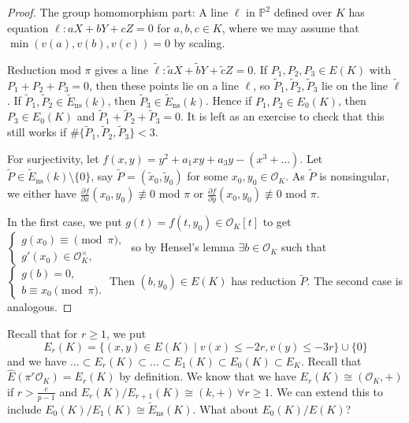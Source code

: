 \documentclass{article}
\theoremstyle{definition}
\begin{document}
\begin{proof}
    The group homomorphism part: A line $\ell$ in $\mathbb{P}^2$ defined over $K$ has equation $\ell : aX+bY+cZ=0$ for $a,b,c \in K$, where we may assume that $\min(v(a),v(b),v(c))=0$ by scaling.
    \vspace{1mm}
     
    Reduction mod $\pi$ gives a line $\widetilde{\ell}: \widetilde{a}X+\widetilde{b}Y+\widetilde{c}Z=0$. If $P_1,P_2,P_3 \in E(K)$ with $P_1+P_2+P_3=0$, then these points lie on a line $\ell$, so $\widetilde{P}_1, \widetilde{P}_2, \widetilde{P}_3$ lie on the line $\widetilde{\ell}$. If $\widetilde{P}_1,\widetilde{P}_2 \in \widetilde{E}_{\text{ns}}(k)$, then $\widetilde{P}_3 \in \widetilde{E}_{\text{ns}}(k)$. Hence if $P_1,P_2 \in E_0(K)$, then $P_3 \in E_0(K)$ and $\widetilde{P}_1 + \widetilde{P}_2 + \widetilde{P}_3=0$. It is left as an exercise to check that this still works if $\#\{\widetilde{P}_1,\widetilde{P}_2,\widetilde{P}_3\}<3$.
    \vspace{1mm}
     
    For surjectivity, let $f(x,y) = y^2+a_1xy+a_3y-(x^3+\ldots)$. Let $\widetilde{P} \in \widetilde{E}_{\text{ns}}(k) \setminus \{0\}$, say $\widetilde{P}=(\widetilde{x}_0,\widetilde{y}_0)$ for some $x_0,y_0 \in \mathcal{O}_K$. As $\widetilde{P}$ is nonsingular, we either have $\frac{\partial f}{\partial x}(x_0,y_0) \not\equiv 0$ mod $\pi$ or $\frac{\partial f}{\partial y}(x_0,y_0) \not\equiv 0$ mod $\pi$.
    \vspace{1mm}
     
    In the first case, we put $g(t)=f(t,y_0) \in \mathcal{O}_K[t]$ to get $\begin{cases}
        g(x_0)\equiv \pmod{\pi},\\
        g'(x_0) \in \mathcal{O}_K^\times,
    \end{cases}$ so by Hensel's lemma $\exists b \in \mathcal{O}_K$ such that $\begin{cases}
        g(b)=0,\\
        b \equiv x_0 \pmod{\pi}. 
    \end{cases}$ Then $(b,y_0) \in E(K)$ has reduction $\widetilde{P}$. The second case is analogous.
\end{proof}
Recall that for $r\ge 1$, we put \[
E_r(K)= \{(x,y) \in E(K) \mid v(x)\le -2r,v(y)\le -3r\} \cup \{0\}
\]
and we have $\ldots \subset E_r(K) \subset \ldots \subset E_1(K) \subset E_0(K)\subset E_K$. Recall that $\widehat{E}(\pi^r \mathcal{O}_K) = E_r(K)$ by definition. We know that we have $E_r(K) \cong (\mathcal{O}_K,+)$ if $r>\frac{e}{p-1}$ and $E_r(K)/E_{r+1}(K) \cong (k,+) ~\forall r\ge 1$. We can extend this to include $E_0(K)/E_1(K) \cong \widetilde{E}_{\text{ns}}(K)$. What about $E_0(K)/E(K)$?
\end{document}
